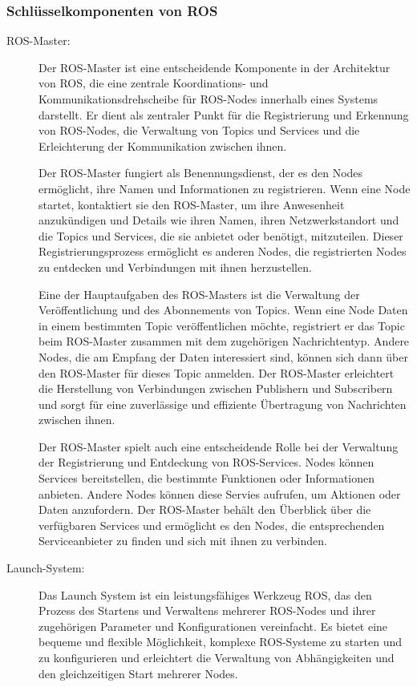 \subsubsection{Schlüsselkomponenten von ROS} \label{schluesselkomponente:subsubsection}
\begin{description}
    \item[ROS-Master:] Der ROS-Master ist eine entscheidende Komponente in der Architektur von \ac{ROS}, die eine zentrale Koordinations- und Kommunikationsdrehscheibe für ROS-Nodes innerhalb eines Systems darstellt. Er dient als zentraler Punkt für die Registrierung und Erkennung von ROS-Nodes, die Verwaltung von Topics und Services und die Erleichterung der Kommunikation zwischen ihnen.

    Der ROS-Master fungiert als Benennungsdienst, der es den Nodes ermöglicht, ihre Namen und Informationen zu registrieren. Wenn eine Node startet, kontaktiert sie den ROS-Master, um ihre Anwesenheit anzukündigen und Details wie ihren Namen, ihren Netzwerkstandort und die Topics und Services, die sie anbietet oder benötigt, mitzuteilen. Dieser Registrierungsprozess ermöglicht es anderen Nodes, die registrierten Nodes zu entdecken und Verbindungen mit ihnen herzustellen.
    
    Eine der Hauptaufgaben des ROS-Masters ist die Verwaltung der Veröffentlichung und des Abonnements von Topics. Wenn eine Node Daten in einem bestimmten Topic veröffentlichen möchte, registriert er das Topic beim ROS-Master zusammen mit dem zugehörigen Nachrichtentyp. Andere Nodes, die am Empfang der Daten interessiert sind, können sich dann über den ROS-Master für dieses Topic anmelden. Der ROS-Master erleichtert die Herstellung von Verbindungen zwischen Publishern und Subscribern und sorgt für eine zuverlässige und effiziente Übertragung von Nachrichten zwischen ihnen.
    
    Der ROS-Master spielt auch eine entscheidende Rolle bei der Verwaltung der Registrierung und Entdeckung von ROS-Services. Nodes können Services bereitstellen, die bestimmte Funktionen oder Informationen anbieten. Andere Nodes können diese Servies aufrufen, um Aktionen oder Daten anzufordern. Der ROS-Master behält den Überblick über die verfügbaren Services und ermöglicht es den Nodes, die entsprechenden Serviceanbieter zu finden und sich mit ihnen zu verbinden.

    \cite[vgl.][]{ros-master}
    
    \item[Launch-System:] Das Launch System ist ein leistungsfähiges Werkzeug \ac{ROS}, das den Prozess des Startens und Verwaltens mehrerer ROS-Nodes und ihrer zugehörigen Parameter und Konfigurationen vereinfacht. Es bietet eine bequeme und flexible Möglichkeit, komplexe \ac{ROS}-Systeme zu starten und zu konfigurieren und erleichtert die Verwaltung von Abhängigkeiten und den gleichzeitigen Start mehrerer Nodes.


\end{description}
